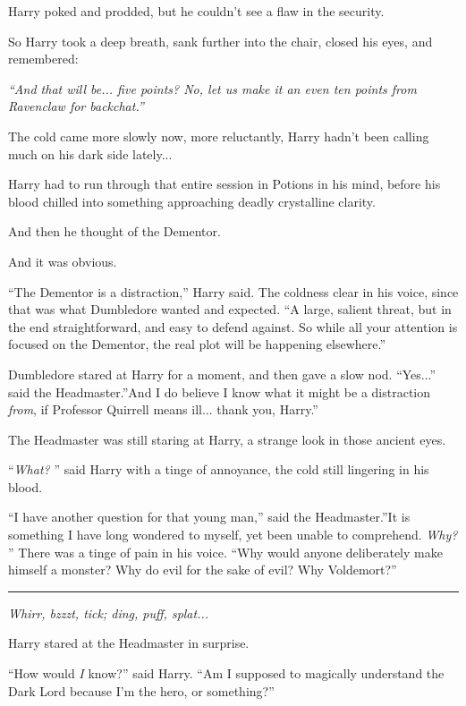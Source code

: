 Harry poked and prodded, but he couldn't see a flaw in the security.

So Harry took a deep breath, sank further into the chair, closed his
eyes, and remembered:

\emph{``And that will be... five points? No, let us make it an even
ten points from Ravenclaw for backchat.''}

The cold came more slowly now, more reluctantly, Harry hadn't been
calling much on his dark side lately...

Harry had to run through that entire session in Potions in his mind,
before his blood chilled into something approaching deadly crystalline
clarity.

And then he thought of the Dementor.

And it was obvious.

``The Dementor is a distraction,'' Harry said. The coldness clear in his
voice, since that was what Dumbledore wanted and expected. ``A large,
salient threat, but in the end straightforward, and easy to defend
against. So while all your attention is focused on the Dementor, the
real plot will be happening elsewhere.''

Dumbledore stared at Harry for a moment, and then gave a slow nod.
``Yes...'' said the Headmaster.''And I do believe I know what it
might be a distraction \emph{from}, if Professor Quirrell means
ill... thank you, Harry.''

The Headmaster was still staring at Harry, a strange look in those
ancient eyes.

``\emph{What?} '' said Harry with a tinge of annoyance, the cold still
lingering in his blood.

``I have another question for that young man,'' said the Headmaster.''It
is something I have long wondered to myself, yet been unable to
comprehend. \emph{Why?} '' There was a tinge of pain in his voice. ``Why
would anyone deliberately make himself a monster? Why do evil for the
sake of evil? Why Voldemort?''

\begin{center}\rule{3in}{0.4pt}\end{center}

\emph{Whirr, bzzzt, tick; ding, puff, splat...}

Harry stared at the Headmaster in surprise.

``How would \emph{I} know?'' said Harry. ``Am I supposed to magically
understand the Dark Lord because I'm the hero, or something?''

